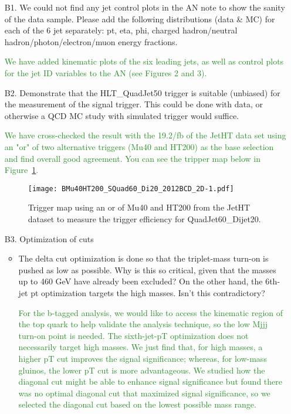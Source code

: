 \documentclass[paper=a4, fontsize=11pt]{scrartcl}
\begin{document}
\begin{itemize}

\item[B1.]  We could not find any jet control plots in the AN note to show the sanity of the data sample. Please add the following distributions (data \& MC) for each of the 6 jet separately: pt, eta, phi, charged hadron/neutral hadron/photon/electron/muon energy fractions.

\textcolor{ForestGreen}{We have added kinematic plots of the six leading jets,
as well as control plots for the jet ID variables to the AN (see Figures 2 and 3).}\\

\item[B2.] Demonstrate that the HLT\_QuadJet50 trigger is suitable (unbiased) for the measurement of the signal trigger. This could be done with data, or otherwise a QCD MC study with simulated trigger would suffice.

\textcolor{ForestGreen}{We have cross-checked the result with the 19.2/fb of the JetHT data set using an "or" of two alternative triggers (Mu40 and HT200)
as the base selection and find overall good agreement.  You can see the tripper map below in Figure~\ref{fig:map}.}\\

\begin{figure}[ht]
 \begin{center}
 \texttt{[image: BMu40HT200\_SQuad60\_Di20\_2012BCD\_2D-1.pdf]}
         \caption{Trigger map using an or of Mu40 and HT200 from the JetHT dataset to measure the trigger efficiency for QuadJet60\_Dijet20.}
   \label{fig:map}
 \end{center}
\end{figure}


\item[B3.] Optimization of cuts
\begin{itemize}

\item The delta cut optimization is done so that the triplet-mass turn-on is pushed as low as possible. Why is this so critical, given that the masses up to 460 GeV have already been excluded? On the other hand, the 6th-jet pt optimization targets the high masses. Isn't this contradictory?

\textcolor{ForestGreen}{For the b-tagged analysis, we would like to access the kinematic region of the top quark to help validate the analysis technique, so
the low Mjjj turn-on point is needed. The sixth-jet-pT optimization does not necessarily target high masses. We just find that, for high masses, a higher pT cut improves the signal significance; whereas, for low-mass gluinos, the lower pT cut is more advantageous. We studied how the diagonal cut might be able to
enhance signal significance but found there was no optimal diagonal cut that maximized signal significance,
so we selected the diagonal cut based on the lowest possible mass range.}\\


\end{itemize}
\end{itemize}
\end{document}

